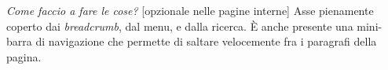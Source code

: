 \textit{Come faccio a fare le cose?} [opzionale nelle pagine interne]\newline
Asse pienamente coperto dai \textit{breadcrumb}, dal menu, e dalla ricerca. \`E anche presente una mini-barra di navigazione che permette di saltare velocemente fra i paragrafi della pagina.